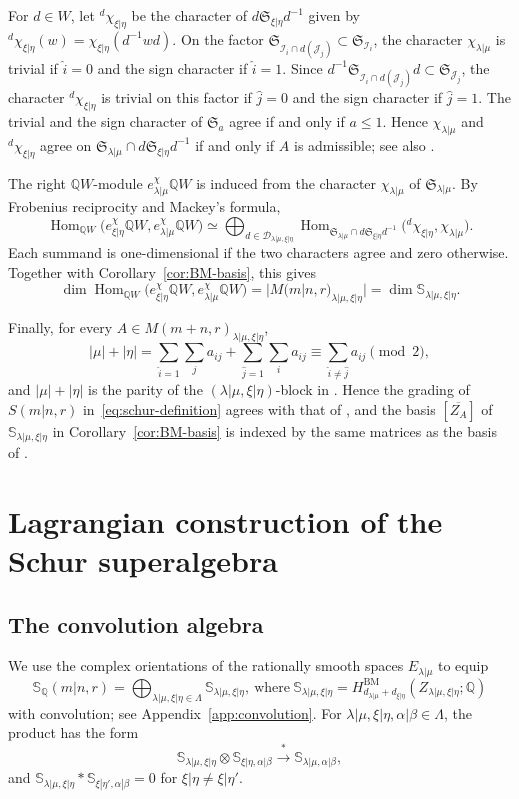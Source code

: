 \documentclass[11pt,a4paper]{amsart}
\theoremstyle{definition}
\theoremstyle{remark}
\newcommand{\Q}{\mathbb Q}
\newcommand{\bS}{\mathbb S}
\newcommand{\BM}{\mathrm{BM}}
\newcommand{\Hom}{\operatorname{Hom}}
\newcommand{\lm}{\lambda|\mu}
\newcommand{\xh}{\xi|\eta}
\newcommand{\ab}{\alpha|\beta}
\newcommand{\Mat}{M(m+n,r)}
\newcommand{\Smat}{M(m|n,r)}
\numberwithin{equation}{section}
\begin{document}
For $d\in W$, let ${}^d\chi_{\xh}$ be the character of
$d\mathfrak S_{\xh}d^{-1}$ given by
${}^d\chi_{\xh}(w)=\chi_{\xh}(d^{-1}wd)$. On the factor
$\mathfrak S_{\mathcal I_i\cap d(\mathcal J_j)}\subset\mathfrak S_{\mathcal I_i}$,
the character $\chi_{\lm}$ is trivial if $\widehat i=0$ and the sign
character if $\widehat i=1$. Since
$d^{-1}\mathfrak S_{\mathcal I_i\cap d(\mathcal J_j)}d\subset\mathfrak S_{\mathcal J_j}$,
the character ${}^d\chi_{\xh}$ is trivial on this factor if
$\widehat j=0$ and the sign character if $\widehat j=1$. The trivial and
the sign character of $\mathfrak S_a$ agree if and only if $a\le1$. Hence
$\chi_{\lm}$ and ${}^d\chi_{\xh}$ agree on
$\mathfrak S_{\lm}\cap d\mathfrak S_{\xh}d^{-1}$ if and only if $A$ is
admissible; see also \cite[Lemma~3.1 and Proposition~3.2]{DuRui}.

The right $\Q W$-module $e^\chi_{\lm}\Q W$ is induced from the character
$\chi_{\lm}$ of $\mathfrak S_{\lm}$. By Frobenius reciprocity and Mackey's
formula,
$$
\Hom_{\Q W}\bigl(e_{\xh}^\chi\Q W,e_{\lm}^\chi\Q W\bigr)\simeq
\bigoplus_{d\in\mathcal D_{\lm,\xh}}
\Hom_{\mathfrak S_{\lm}\cap d\mathfrak S_{\xh}d^{-1}}
\bigl({}^d\chi_{\xh},\chi_{\lm}\bigr).
$$
Each summand is one-dimensional if the two characters agree and zero
otherwise. Together with Corollary~\ref{cor:BM-basis}, this gives
\begin{equation}\label{eq:Mackey}
\dim\Hom_{\Q W}\bigl(e_{\xh}^\chi\Q W,e_{\lm}^\chi\Q W\bigr)
=|\Smat_{\lm,\xh}|=\dim\bS_{\lm,\xh}.
\end{equation}

Finally, for every $A\in\Mat_{\lm,\xh}$,
$$
|\mu|+|\eta|=\sum_{\widehat i=1}\sum_ja_{ij}+\sum_{\widehat j=1}\sum_ia_{ij}
\equiv\sum_{\widehat i\ne\widehat j}a_{ij}\pmod2,
$$
and $|\mu|+|\eta|$ is the parity of the $(\lm,\xh)$-block in \cite[(5.6.1)]{DuRui}. Hence the grading of
$S(m|n,r)$ in~\eqref{eq:schur-definition} agrees with that of
\cite{DuRui}, and the basis $[\overline{Z_A}]$ of $\bS_{\lm,\xh}$ in
Corollary~\ref{cor:BM-basis} is indexed by the same matrices as the basis of
\cite[Theorem~5.8]{DuRui}.

\section{Lagrangian construction of the Schur superalgebra}
\label{sec:construction}

\subsection{The convolution algebra}
\label{sec:convolution-algebra}
\label{sec:BM}
We use the complex orientations of the rationally smooth spaces
$E_{\lm}$ to equip
$$
\bS_\Q(m|n,r)=\bigoplus_{\lm,\xh\in\Lambda}\bS_{\lm,\xh},\ \text{where}\
\bS_{\lm,\xh}=H^{\BM}_{d_{\lm}+d_{\xh}}(Z_{\lm,\xh};\Q)
$$
with convolution; see Appendix~\ref{app:convolution}.
For $\lm,\xh,\ab\in\Lambda$, the product has the form
$$
\bS_{\lm,\xh}\otimes\bS_{\xh,\ab}
\xrightarrow{\ *\ }\bS_{\lm,\ab},
$$
and $\bS_{\lm,\xh}*\bS_{\xh',\ab}=0$ for $\xh\neq\xh'$.
\end{document}
